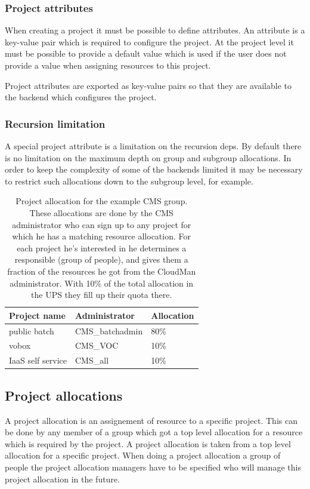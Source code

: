 \subsubsection{Project attributes}
When creating a project it must be possible to define attributes. An attribute is a key-value pair which is required to configure the project. At the project level it must be possible to provide a default value which is used if the user does not provide a value when assigning resources to this project. 

Project attributes are exported as key-value pairs so that they are available to the backend which configures the project. 

\subsubsection{Recursion limitation}
A special project attribute is a limitation on the recursion deps. By default there is no limitation on the maximum depth on group and subgroup allocations. In order to keep the complexity of some of the backends limited it may be necessary to restrict such allocations down to the subgroup level, for example. 


\begin{table}[htb]
\begin{center}
\begin{tabular}{|l|l|l|}
\hline
Project name & Administrator & Allocation \\
\hline
public batch & CMS\_batchadmin& 80\%\\
vobox & CMS\_VOC & 10\%\\
IaaS self service & CMS\_all& 10\% \\ 
\hline
\end{tabular}
\end{center}
\caption{\label{projectsAllocation} Project allocation for the example CMS group. These allocations are done by the CMS administrator who can sign up to any project for which he has a matching resource allocation. For each project he's interested in he determines a responsible (group of people), and gives them a fraction of the resources he got from the CloudMan administrator. With 10\% of the total allocation in the UPS they fill up their quota there.}
\end{table}

\subsection{Project allocations}
A project allocation is an assignement of resource to a specific project. This can be done by any member of a group which got a top level allocation for a resource which is required by the project. A project allocation is taken from a top level allocation for a specific project. When doing a project allocation a group of people the project allocation managers  have to be specified who will manage this project allocation in the future.

